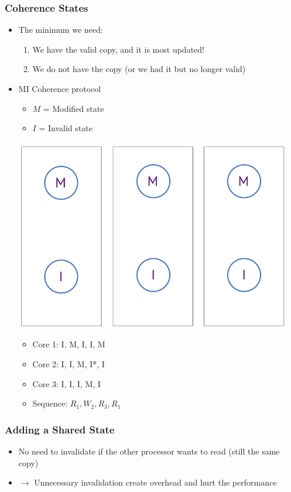 \documentclass[10pt]{article}
\begin{document}
\subsubsection*{Coherence States}
\begin{itemize}
    \item The minimum we need:
    \begin{enumerate}[label=\alph*.]
        \item We have the valid copy, and it is most updated!
        \item We do not have the copy (or we had it but no longer valid)
    \end{enumerate}
    \item MI Coherence protocol
    \begin{itemize}
        \item $M$ = Modified state
        \item $I$ = Invalid state
    \end{itemize}
    \begin{center}
        \includegraphics*[scale=0.7]{W8_11.png}
    \end{center}
    \begin{itemize}
        \item Core 1: I, M, I, I, M
        \item Core 2: I, I, M, I*, I
        \item Core 3: I, I, I, M, I
        \item Sequence: $R_1, W_2, R_3, R_1$
    \end{itemize}
\end{itemize}
\subsubsection*{Adding a Shared State}
\begin{itemize}
    \item No need to invalidate if the other processor wants to read (still the same copy)
    \item $\rightarrow$ Unnecessary invalidation create overhead and hurt the performance
\end{itemize}
\end{document}
